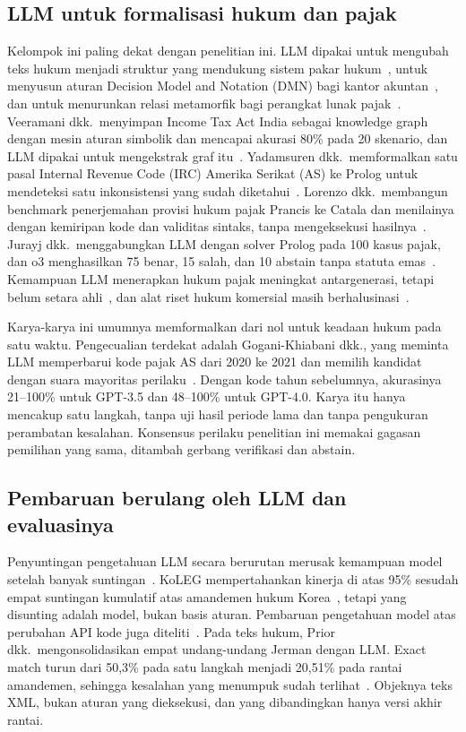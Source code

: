 \documentclass[conference]{IEEEtran}
\makeatletter
\DeclareRobustCommand{\en}[1]{{\usefont{\f@encoding}{\f@family}{\f@series}{it}#1\/}}
\makeatother
\begin{document}
\subsection{LLM untuk formalisasi hukum dan pajak}
Kelompok ini paling dekat dengan penelitian ini. LLM dipakai untuk mengubah teks hukum menjadi struktur yang mendukung sistem pakar hukum~\cite{janatian2023texttostructure}, untuk menyusun aturan \en{Decision Model and Notation} (DMN) bagi kantor akuntan~\cite{makowski2025dmn}, dan untuk menurunkan relasi metamorfik bagi perangkat lunak pajak~\cite{srinivas2023fewshot,khiabani2026agentic}. Veeramani dkk.\ menyimpan \en{Income Tax Act} India sebagai \en{knowledge graph} dengan mesin aturan simbolik dan mencapai akurasi 80\% pada 20 skenario, dan LLM dipakai untuk mengekstrak graf itu~\cite{veeramani2026neurosymbolic}. Yadamsuren dkk.\ memformalkan satu pasal \en{Internal Revenue Code} (IRC) Amerika Serikat (AS) ke Prolog untuk mendeteksi satu inkonsistensi yang sudah diketahui~\cite{yadamsuren2026formalization}. Lorenzo dkk.\ membangun \en{benchmark} penerjemahan provisi hukum pajak Prancis ke Catala dan menilainya dengan kemiripan kode dan validitas sintaks, tanpa mengeksekusi hasilnya~\cite{lorenzo2025translating}. Jurayj dkk.\ menggabungkan LLM dengan \en{solver} Prolog pada 100 kasus pajak, dan o3 menghasilkan 75 benar, 15 salah, dan 10 \en{abstain} tanpa statuta emas~\cite{jurayj2026tax}. Kemampuan LLM menerapkan hukum pajak meningkat antargenerasi, tetapi belum setara ahli~\cite{blairstanek2023gpt3,nay2024taxattorneys}, dan alat riset hukum komersial masih berhalusinasi~\cite{magesh2025hallucination}.

Karya-karya ini umumnya memformalkan dari nol untuk keadaan hukum pada satu waktu. Pengecualian terdekat adalah Gogani-Khiabani dkk., yang meminta LLM memperbarui kode pajak AS dari 2020 ke 2021 dan memilih kandidat dengan suara mayoritas perilaku~\cite{goganikhiabani2025maintaining}. Dengan kode tahun sebelumnya, akurasinya 21--100\% untuk GPT-3.5 dan 48--100\% untuk GPT-4.0. Karya itu hanya mencakup satu langkah, tanpa uji hasil periode lama dan tanpa pengukuran perambatan kesalahan. Konsensus perilaku penelitian ini memakai gagasan pemilihan yang sama, ditambah gerbang verifikasi dan \en{abstain}.

\subsection{Pembaruan berulang oleh LLM dan evaluasinya}
Penyuntingan pengetahuan LLM secara berurutan merusak kemampuan model setelah banyak suntingan~\cite{gupta2024editing,gu2024harms}. KoLEG mempertahankan kinerja di atas 95\% sesudah empat suntingan kumulatif atas amandemen hukum Korea~\cite{seo2025koleg}, tetapi yang disunting adalah model, bukan basis aturan. Pembaruan pengetahuan model atas perubahan API kode juga diteliti~\cite{wu2026recode}. Pada teks hukum, Prior dkk.\ mengonsolidasikan empat undang-undang Jerman dengan LLM. \en{Exact match} turun dari 50,3\% pada satu langkah menjadi 20,51\% pada rantai amandemen, sehingga kesalahan yang menumpuk sudah terlihat~\cite{prior2025risks}. Objeknya teks XML, bukan aturan yang dieksekusi, dan yang dibandingkan hanya versi akhir rantai.
\end{document}
